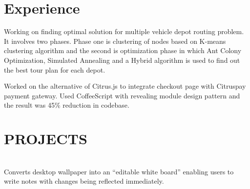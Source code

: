 \documentclass[]{deedy-resume-openfont}
\begin{document}
\begin{minipage}[t]{0.66\textwidth} 


\section{Experience}

\vspace{\topsep} 
\begin{tightemize}
\item Working on finding optimal solution for multiple vehicle depot routing problem. It involves two phases. Phase one is clustering of nodes based on K-means clustering algorithm and the second is optimization phase in which Ant Colony Optimization, Simulated Annealing and a Hybrid algorithm is used to find out the best tour plan for each depot.\end{tightemize}
\sectionsep

\vspace{\topsep} 
\begin{tightemize}
\item Worked on the alternative of Citrus.js to integrate checkout page with Citruspay payment gateway. Used CoffeeScript with revealing module design pattern and the result was 45\% reduction in codebase.\end{tightemize}
\sectionsep


\section{PROJECTS}

\\
Converts desktop wallpaper into an “editable white board” enabling users to write notes with changes being reflected immediately. \textbf{\href{https://github.com/tushar-rishav/wallnote}{ }}
\sectionsep


\end{minipage}
\end{document}
